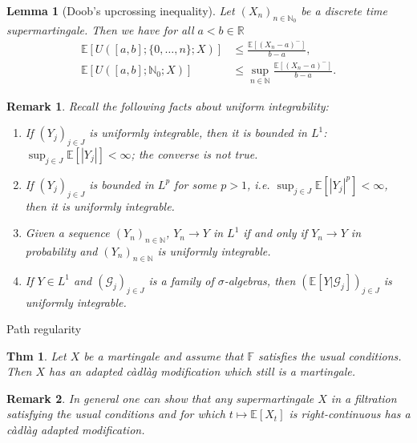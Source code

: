 \documentclass[a4paper]{article}
\theoremstyle{mytheoremstyle}
\newtheorem{theorem}{Thm}
\newtheorem{lemma}{Lemma}
\newtheorem*{remark}{Remark}
\newcommand{\1}{\mathds{1}}
\begin{document}
\begin{multicols*}{3}
\begin{unlabeledbox}
\begin{lemma}[Doob's upcrossing inequality]
  \label{lem:upcrossing}Let $(X_n)_{n \in \mathbb{N}_0}$ be a discrete time
  supermartingale. Then we have for all $a < b \in \mathbb{R}$
  \begin{align*}
    \mathbb{E} [U ([a, b] ; \{ 0, \ldots, n \} ; X)]
      & \leqslant \frac{\mathbb{E} [(X_n - a)^-]}{b - a}, \\
    \mathbb{E} [U ([a, b] ; \mathbb{N}_0 ; X)]
      & \leqslant \sup_{n \in \mathbb{N}} \frac{\mathbb{E} [(X_n - a)^-]}{b - a} .
  \end{align*}
\end{lemma}

\begin{remark}
  \label{rem:uniform.integrability}Recall the following facts about uniform
  integrability:
  \begin{enumerate}
    \item If $(Y_j)_{j \in J}$ is uniformly integrable, then it is bounded in
    $L^1$: $\sup_{j \in J} \mathbb{E} [| Y_j |] < \infty$; the converse is not
    true.
    
    \item If $(Y_j)_{j \in J}$ is bounded in $L^p$ for some $p > 1$, i.e.
    $\sup_{j \in J} \mathbb{E} [| Y_j |^p] < \infty$, then it is uniformly
    integrable.
    
    \item Given a sequence $(Y_n)_{n \in \mathbb{N}}$, $Y_n \rightarrow Y$ in
    $L^1$ if and only if $Y_n \rightarrow Y$ in probability and $(Y_n)_{n \in
    \mathbb{N}}$ is uniformly integrable.
    
    \item If $Y \in L^1$ and $(\mathcal{G}_j)_{j \in J}$ is a family of
    $\sigma$-algebras, then $(\mathbb{E} [Y| \mathcal{G}_j])_{j \in J}$ is
    uniformly integrable.
  \end{enumerate}
\end{remark}
\end{unlabeledbox}

\begin{roundbox}{Path regularity}
\begin{theorem}
  \label{thm:submartingale cadlag}Let $X$ be a martingale and assume that
  $\mathbb{F}$ satisfies the usual conditions. Then $X$ has an adapted
  c{\`a}dl{\`a}g modification which still is a martingale.
\end{theorem}

\begin{remark}
  In general one can show that any supermartingale $X$ in a filtration
  satisfying the usual conditions and for which $t \mapsto \mathbb{E} [X_t]$
  is right-continuous has a c{\`a}dl{\`a}g adapted modification.
\end{remark}


\end{roundbox}
\end{multicols*}
\end{document}
